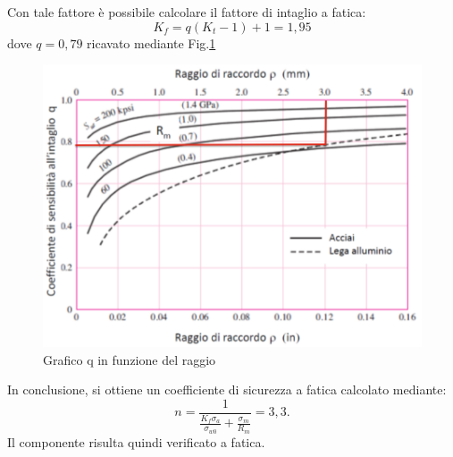 Con tale fattore è possibile calcolare il fattore di intaglio a fatica:
\begin{equation}
    K_f=q\left(K_t-1\right)+1=1,95
\end{equation}
dove $q=0,79$ ricavato mediante Fig.\ref{fig:KfBiella}
\begin{figure}[h]
    \centering
    \includegraphics[scale=0.4]{Immagini/KfBiella.png}
    \caption{Grafico q in funzione del raggio }
    \label{fig:KfBiella}
\end{figure}

In conclusione, si ottiene un coefficiente di sicurezza a fatica calcolato mediante:
\begin{equation}
    n=\frac{1}{\frac{K_f\sigma_a}{\sigma_{w0}}+\frac{\sigma_m}{R_m}}=3,3.
\end{equation}
Il componente risulta quindi verificato a fatica. 
